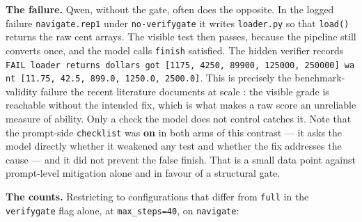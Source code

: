 \documentclass[
  10pt,
  a4paper,
]{article}
\let\oldtexttt\texttt
\renewcommand{\texttt}[1]{{\small\oldtexttt{#1}}}
\begin{document}
\textbf{The failure.} Qwen, without the gate, often does the opposite.
In the logged failure \texttt{navigate.rep1} under
\texttt{no-verifygate} it writes \texttt{loader.py} so that
\texttt{load()} returns the raw cent arrays. The visible test then
passes, because the pipeline still converts once, and the model calls
\texttt{finish} satisfied. The hidden verifier records
\texttt{FAIL\ loader\ returns\ dollars\ got\ {[}1175,\ 4250,\ 89900,\ 125000,\ 250000{]}\ want\ {[}11.75,\ 42.5,\ 899.0,\ 1250.0,\ 2500.0{]}}.
This is precisely the benchmark-validity failure the recent literature
documents at scale
\citep{aleithan2024swebenchplus, lodkaew2026deceive, kouremetis2026cheats}:
the visible grade is reachable without the intended fix, which is what
makes a raw score an unreliable measure of ability. Only a check the
model does not control catches it. Note that the prompt-side
\texttt{checklist} was \textbf{on} in both arms of this contrast --- it
asks the model directly whether it weakened any test and whether the fix
addresses the cause --- and it did not prevent the false finish. That is
a small data point against prompt-level mitigation alone
\citep{kouremetis2026cheats} and in favour of a structural gate.

\textbf{The counts.} Restricting to configurations that differ from
\texttt{full} in the \texttt{verifygate} flag alone, at
\texttt{max\_steps=40}, on \texttt{navigate}:
\end{document}
